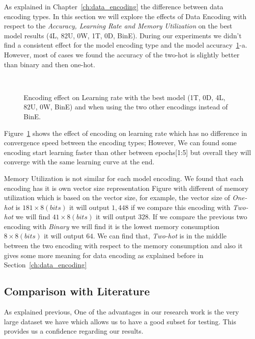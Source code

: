 As explained in Chapter~\ref{ch:data_encoding} the difference between data encoding types. In this section we will explore the effects of Data Encoding with respect to the \textit{Accuracy, Learning Rate and Memory Utilization} on the best model results (4L, 82U, 0W, 1T, 0D, BinE). During our experiments we didn't find a consistent effect for the model encoding type and the model accuracy~\ref{fig:Convergence_Memory}-a. However, most of cases we found the accuracy of the two-hot is slightly better than binary and then one-hot.


\begin{figure}[!h]
  \centering
  \begin{tikzpicture}
    
  \end{tikzpicture}
  \caption{Encoding effect on Learning rate with the best model (1T, 0D, 4L, 82U, 0W, BinE) and when using the two other encodings instead of BinE.}~\label{fig:Convergence_Memory}%
\end{figure}


Figure~\ref{fig:Convergence_Memory} shows the effect of encoding on learning rate which has no difference in convergence speed between the encoding types; However, We can found some encoding start learning faster than other between epochs[1:5] but overall they will converge with the same learning curve at the end.


Memory Utilization is not similar for each model encoding. We found that each encoding has it is own vector size representation Figure with different of memory utilization which is based on the vector size, for example, the vector size of \textit{One-hot} is $181 \times 8(bits)$ it will output $1,448$ if we compare this encoding with \textit{Two-hot} we will find $41 \times 8(bits)$ it will output $328$. If we compare the previous two encoding with \textit{Binary} we will find it is the lowest memory consumption $8 \times 8(bits)$ it will output $64$. We can find that, \textit{Two-hot} is in the middle between the two encoding with respect to the memory consumption and also it gives some more meaning for data encoding as explained before in Section~\ref{ch:data_encoding}

\subsection{Comparison with Literature}
As explained previous, One of the advantages in our research work is the very large dataset we have which allows us to have a good subset for testing. This provides us a confidence regarding our results.

